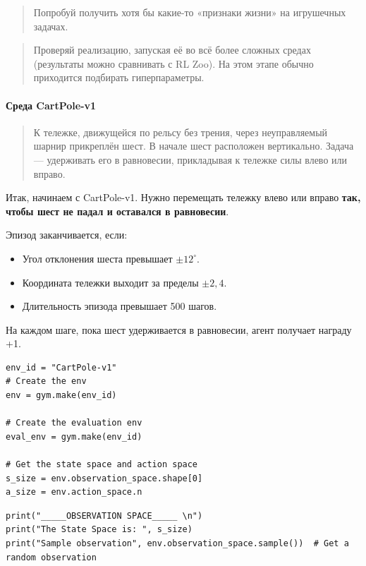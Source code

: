 \documentclass[11pt,a4paper]{article}
\begin{document}
\begin{quote}
Попробуй получить хотя бы какие-то «признаки жизни» на игрушечных задачах.
\end{quote}

\begin{quote}
Проверяй реализацию, запуская её во всё более сложных средах (результаты можно сравнивать с RL Zoo). На этом этапе обычно приходится подбирать гиперпараметры.
\end{quote}

\paragraph{Среда CartPole-v1}\label{the-cartpole-v1-environment}

\begin{quote}
К тележке, движущейся по рельсу без трения, через неуправляемый шарнир прикреплён шест. В начале шест расположен вертикально. Задача --- удерживать его в равновесии, прикладывая к тележке силы влево или вправо.
\end{quote}

Итак, начинаем с CartPole-v1. Нужно перемещать тележку влево или вправо \textbf{так, чтобы шест не падал и оставался в равновесии}.

Эпизод заканчивается, если:

\begin{itemize}
\tightlist
\item
  Угол отклонения шеста превышает \(\pm12^{\circ}\).
\item
  Координата тележки выходит за пределы \(\pm2{,}4\).
\item
  Длительность эпизода превышает 500 шагов.
\end{itemize}

На каждом шаге, пока шест удерживается в равновесии, агент получает награду +1.

\begin{lstlisting}
env_id = "CartPole-v1"
# Create the env
env = gym.make(env_id)

# Create the evaluation env
eval_env = gym.make(env_id)

# Get the state space and action space
s_size = env.observation_space.shape[0]
a_size = env.action_space.n
\end{lstlisting}

\begin{lstlisting}
print("_____OBSERVATION SPACE_____ \n")
print("The State Space is: ", s_size)
print("Sample observation", env.observation_space.sample())  # Get a random observation
\end{lstlisting}
\end{document}
